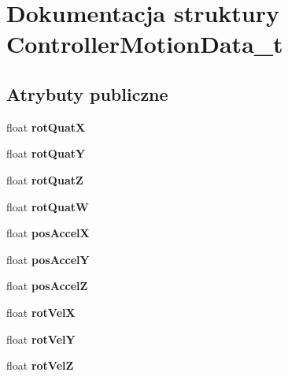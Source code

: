 \hypertarget{struct_controller_motion_data__t}{}\section{Dokumentacja struktury Controller\+Motion\+Data\+\_\+t}
\label{struct_controller_motion_data__t}
\subsection*{Atrybuty publiczne}
\begin{DoxyCompactItemize}
\item 
\mbox{\label{struct_controller_motion_data__t_a841e99a288433e6edf6604b12a199a6a}} 
float {\bfseries rot\+QuatX}
\item 
\mbox{\label{struct_controller_motion_data__t_af9f5b5598711c1a3261f2138c6104044}} 
float {\bfseries rot\+QuatY}
\item 
\mbox{\label{struct_controller_motion_data__t_ac9ee59e58ac0d0d803621fa03b93c348}} 
float {\bfseries rot\+QuatZ}
\item 
\mbox{\label{struct_controller_motion_data__t_a188bfb6624d1365d65d21df87716d3c0}} 
float {\bfseries rot\+QuatW}
\item 
\mbox{\label{struct_controller_motion_data__t_a284d030b32b6f21818c341d451841dc0}} 
float {\bfseries pos\+AccelX}
\item 
\mbox{\label{struct_controller_motion_data__t_a39cc5d5ed82ffac5086b0fcc6e4cd37c}} 
float {\bfseries pos\+AccelY}
\item 
\mbox{\label{struct_controller_motion_data__t_accf3b6cb7d1c59baffd31a3757ccb740}} 
float {\bfseries pos\+AccelZ}
\item 
\mbox{\label{struct_controller_motion_data__t_ac36870c4db488b15e001ce65e3625c99}} 
float {\bfseries rot\+VelX}
\item 
\mbox{\label{struct_controller_motion_data__t_a0f6d3a0c803301c047a5e923cf5d2419}} 
float {\bfseries rot\+VelY}
\item 
\mbox{\label{struct_controller_motion_data__t_a96286edaa47a1545a1bfe7b2a1ab3303}} 
float {\bfseries rot\+VelZ}
\end{DoxyCompactItemize}


